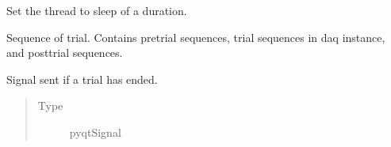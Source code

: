 \documentclass[letterpaper,10pt,english]{sphinxmanual}
\begin{document}
\begin{fulllineitems}
\begin{fulllineitems}
\begin{quote}
\begin{description}
\begin{itemize}
\end{itemize}

\end{description}\end{quote}

\end{fulllineitems}


\begin{fulllineitems}
\label{\detokenize{NoSeMazeControl/Controllers:Controllers.ExperimentControl.ExperimentWorker.timeout}}
\pysigstartsignatures
{}
\pysigstopsignatures
\sphinxAtStartPar
Set the thread to sleep of a duration.

\end{fulllineitems}


\begin{fulllineitems}
\label{\detokenize{NoSeMazeControl/Controllers:Controllers.ExperimentControl.ExperimentWorker.trial}}
\pysigstartsignatures
{}
\pysigstopsignatures
\sphinxAtStartPar
Sequence of trial. Contains pre\sphinxhyphen{}trial sequences, trial sequences in
daq instance, and post\sphinxhyphen{}trial sequences.

\end{fulllineitems}


\begin{fulllineitems}
\label{\detokenize{NoSeMazeControl/Controllers:Controllers.ExperimentControl.ExperimentWorker.trial_end}}
\pysigstartsignatures
{}
\pysigstopsignatures
\sphinxAtStartPar
Signal sent if a trial has ended.
\begin{quote}\begin{description}
\item[{Type}] \leavevmode
\sphinxAtStartPar
pyqtSignal

\end{description}\end{quote}

\end{fulllineitems}


\end{fulllineitems}
\end{document}
